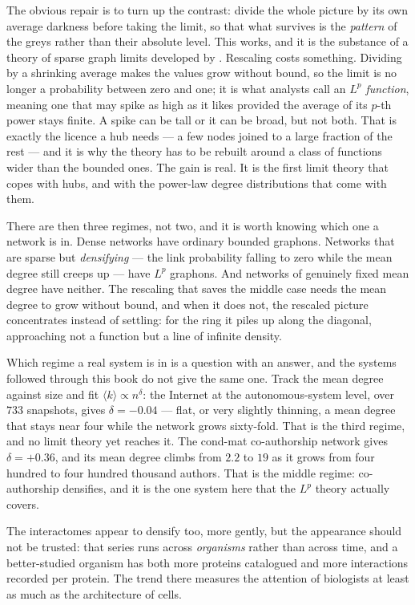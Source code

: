 The obvious repair is to turn up the contrast: divide the whole picture by its
own average darkness before taking the limit, so that what survives is the
\emph{pattern} of the greys rather than their absolute level. This works, and it
is the substance of a theory of sparse graph limits developed by
\citet{borgs2019}. Rescaling costs something. Dividing by a shrinking average
makes the values grow without bound, so the limit is no longer a probability
between zero and one; it is what analysts call an \emph{$L^p$ function}, meaning
one that may spike as high as it likes provided the average of its $p$-th power
stays finite. A spike can be tall or it can be broad, but not both. That is
exactly the licence a hub needs --- a few nodes joined to a large fraction of the
rest --- and it is why the theory has to be rebuilt around a class of functions
wider than the bounded ones. The gain is real. It is the first limit theory that copes with hubs, and with the
power-law degree distributions that come with them.

There are then three regimes, not two, and it is worth knowing which one a
network is in. Dense networks have ordinary bounded graphons. Networks that are
sparse but \emph{densifying} --- the link probability falling to zero while the
mean degree still creeps up --- have $L^p$ graphons. And networks of genuinely
fixed mean degree have neither. The rescaling that saves the middle case needs the
mean degree to grow without bound, and when it does not, the rescaled picture
concentrates instead of settling: for the ring it piles up along the diagonal,
approaching not a function but a line of infinite density.

Which regime a real system is in is a question with an answer, and the systems
followed through this book do not give the same one. Track the mean degree against
size and fit $\langle k\rangle\propto n^{\delta}$: the Internet at the
autonomous-system level, over $733$ snapshots, gives $\delta=-0.04$ --- flat, or
very slightly thinning, a mean degree that stays near four while the network grows
sixty-fold. That is the third regime, and no limit theory yet reaches it. The
cond-mat co-authorship network gives $\delta=+0.36$, and its mean degree climbs
from $2.2$ to $19$ as it grows from four hundred to four hundred thousand authors.
That is the middle regime: co-authorship densifies, and it is the one system here
that the $L^p$ theory actually covers.

The interactomes appear to densify too, more gently, but the appearance should not
be trusted: that series runs across \emph{organisms} rather than across time, and
a better-studied organism has both more proteins catalogued and more interactions
recorded per protein. The trend there measures the attention of biologists at
least as much as the architecture of cells.

